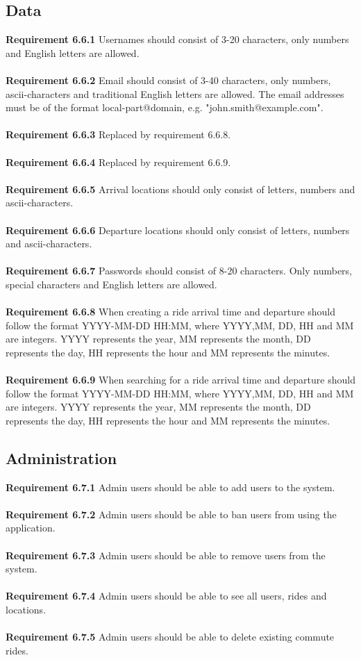 \documentclass{article}
\begin{document}
\subsection{Data} \label{section:data}
\textbf{Requirement 6.6.1} Usernames should consist of 3-20 characters, only numbers and English letters are allowed. 
\mbox{}\\
\\
\textbf{Requirement 6.6.2} Email should consist of 3-40 characters, only numbers, ascii-characters and traditional English letters are allowed. The email addresses must be of the format local-part@domain, e.g. "john.smith@example.com".
\mbox{}\\
\\
\textbf{Requirement 6.6.3} Replaced by requirement 6.6.8.
\\ \\
\textbf{Requirement 6.6.4} Replaced by requirement 6.6.9.
\\ \\
\textbf{Requirement 6.6.5} Arrival locations should only consist of letters, numbers and ascii-characters.
\\ \\
\textbf{Requirement 6.6.6} Departure locations should only consist of letters, numbers and ascii-characters.
\\ \\
\textbf{Requirement 6.6.7} Passwords should consist of 8-20 characters. Only numbers, special characters and English letters are allowed.
\\ \\
\textbf{Requirement 6.6.8} When creating a ride arrival time and departure should follow the format YYYY-MM-DD HH:MM, where YYYY,MM, DD, HH and MM are integers. YYYY represents the year, MM represents the month, DD represents the day, HH represents the hour and MM represents the minutes. 
\\ \\
\textbf{Requirement 6.6.9}  When searching for a ride arrival time and departure should follow the format YYYY-MM-DD HH:MM, where YYYY,MM, DD, HH and MM are integers. YYYY represents the year, MM represents the month, DD represents the day, HH represents the hour and MM represents the minutes. 

\subsection{Administration}
\textbf{Requirement 6.7.1} Admin users should be able to add users to the system.
\\ \\
\textbf{Requirement 6.7.2} Admin users should be able to ban users from using the application.
\\ \\
\textbf{Requirement 6.7.3} Admin users should be able to remove users from the system.
\\ \\
\textbf{Requirement 6.7.4} Admin users should be able to see all users, rides and locations.
\\ \\
\textbf{Requirement 6.7.5} Admin users should be able to delete existing commute rides.
\end{document}
